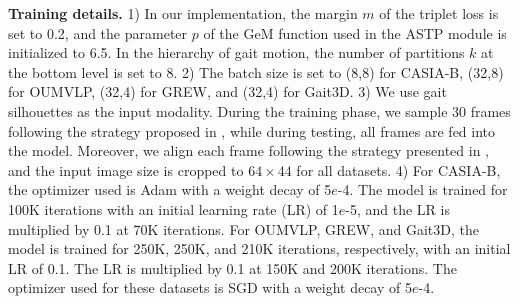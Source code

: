 \documentclass[10pt,twocolumn,letterpaper]{article}
\begin{document}
\noindent \textbf{Training details.} 1) In our implementation, the margin $m$ of the triplet loss is set to 0.2, and the parameter $p$ of the GeM function used in the ASTP module is initialized to 6.5. In the hierarchy of gait motion, the number of partitions $k$ at the bottom level is set to 8. 2) The batch size is set to (8,8) for CASIA-B, (32,8) for OUMVLP, (32,4) for GREW, and (32,4) for Gait3D. 3) We use gait silhouettes as the input modality. During the training phase, we sample 30 frames following the strategy proposed in \cite{fan2020gaitpart}, while during testing, all frames are fed into the model. Moreover, we align each frame following the strategy presented in \cite{NorikoTakemura2018MultiviewLP}, and the input image size is cropped to $64 \times 44$ for all datasets. 4) For CASIA-B, the optimizer used is Adam with a weight decay of 5$e$-4. The model is trained for 100K iterations with an initial learning rate (LR) of 1$e$-5, and the LR is multiplied by 0.1 at 70K iterations. For OUMVLP, GREW, and Gait3D, the model is trained for 250K, 250K, and 210K iterations, respectively, with an initial LR of 0.1. The LR is multiplied by 0.1 at 150K and 200K iterations. The optimizer used for these datasets is SGD with a weight decay of 5$e$-4.
\end{document}
